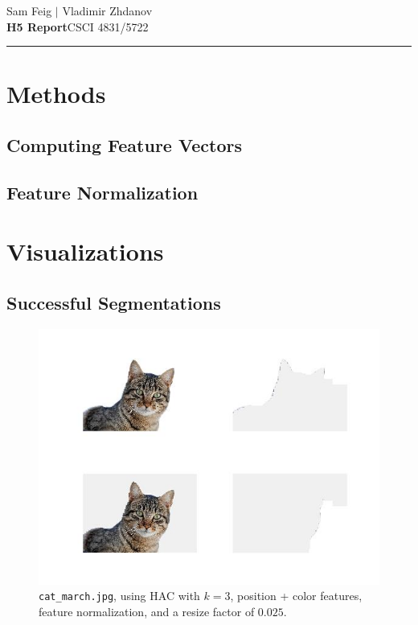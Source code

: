 \documentclass[12pt]{article}
\begin{document}
\hfill Sam Feig $|$ Vladimir Zhdanov \\
\textbf{H5 Report}\hfill CSCI 4831/5722 \\
\rule{\textwidth}{.75pt}

\section{Methods}

\subsection{Computing Feature Vectors}
\subsection{Feature Normalization}

\section{Visualizations}

\subsection{Successful Segmentations}
\begin{figure}[H]
	\centering
	\includegraphics[width=.9\textwidth]{succ1.jpg}
	\caption{\texttt{cat\_march.jpg}, using HAC with $k = 3$, position + color features, feature normalization, and a resize factor of $0.025$.}
\end{figure}
\end{document}
